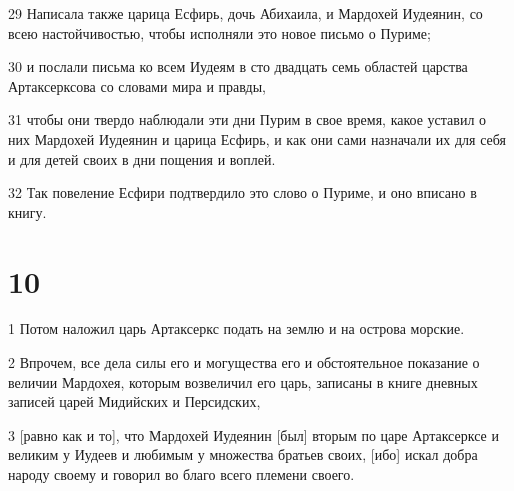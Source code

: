 \par 29 Написала также царица Есфирь, дочь Абихаила, и Мардохей Иудеянин, со всею настойчивостью, чтобы исполняли это новое письмо о Пуриме;
\par 30 и послали письма ко всем Иудеям в сто двадцать семь областей царства Артаксерксова со словами мира и правды,
\par 31 чтобы они твердо наблюдали эти дни Пурим в свое время, какое уставил о них Мардохей Иудеянин и царица Есфирь, и как они сами назначали их для себя и для детей своих в дни пощения и воплей.
\par 32 Так повеление Есфири подтвердило это слово о Пуриме, и оно вписано в книгу.

\chapter{10}

\par 1 Потом наложил царь Артаксеркс подать на землю и на острова морские.
\par 2 Впрочем, все дела силы его и могущества его и обстоятельное показание о величии Мардохея, которым возвеличил его царь, записаны в книге дневных записей царей Мидийских и Персидских,
\par 3 [равно как и то], что Мардохей Иудеянин [был] вторым по царе Артаксерксе и великим у Иудеев и любимым у множества братьев своих, [ибо] искал добра народу своему и говорил во благо всего племени своего.


